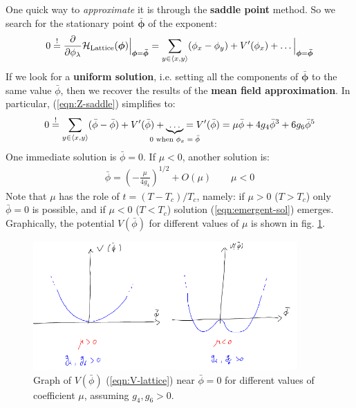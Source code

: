 \documentclass[../../main.tex]{subfiles}
\begin{document}
One quick way to \textit{approximate} it is through the \textbf{saddle point} method. So we search for the stationary point $\bm{\bar{\phi}}$ of the exponent:
\begin{align}\label{eqn:Z-saddle}
    0 \overset{!}{=}  \pdv{\phi_\lambda} \mathcal{H}_{\mathrm{Lattice}}(\bm{\phi})\Big|_{\bm{\phi} = \bm{\bar{\phi}}} = \sum_{y \in \langle x,y \rangle} (\phi_x - \phi_y) + V'(\phi_x) + \dots \Big|_{\bm{\phi} = \bm{\bar{\phi}}}
\end{align}  
If we look for a \textbf{uniform solution}, i.e. setting all the components of $\bm{\bar{\phi}}$ to the same value $\bar{\phi}$, then we recover the results of the \textbf{mean field approximation}. In particular, (\ref{eqn:Z-saddle}) simplifies to:
\begin{align*}
    0 \overset{!}{=}  \sum_{y \in \langle x,y \rangle} (\bar{\phi} - \bar{\phi}) + V'(\bar{\phi}) + \underbrace{\dots}_{\mathclap{0 \text{ when $\phi_x = \bar{\phi}$}}} = V'(\bar{\phi}) = \mu \bar{\phi} + 4 g_4 \bar{\phi}^3 + 6g_6 \bar{\phi}^5
\end{align*}
One immediate solution is $\bar{\phi} = 0$. If $\mu < 0$, another solution is:
\begin{align}\label{eqn:emergent-sol}
    \bar{\phi} = \left(-\frac{\mu}{4 g_4} \right)^{1/2} + O(\mu) \qquad \mu < 0
\end{align}
Note that $\mu$ has the role of $t = (T-T_c)/T_c$, namely: if $\mu > 0$ ($T>T_c$) only $\bar{\phi} = 0$ is possible, and if $\mu < 0$ ($T < T_c$) solution (\ref{eqn:emergent-sol}) emerges. Graphically, the potential $V(\bar{\phi})$ for different values of $\mu$ is shown in fig. \ref{fig:pot-mu}.

\begin{figure}[H]
    \centering
    \includegraphics[width=0.9\textwidth]{pot-mu.png}
    \caption{Graph of $V(\bar{\phi})$ (\ref{eqn:V-lattice}) near $\bar{\phi}=0$ for different values of coefficient $\mu$, assuming $g_4, g_6 > 0$.}
    \label{fig:pot-mu}
\end{figure}
\end{document}
